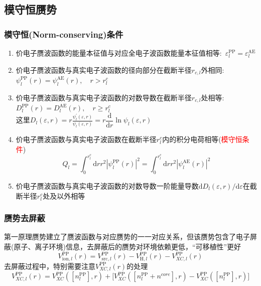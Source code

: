 \subsection{模守恒赝势}
\frame
{
	\frametitle{模守恒\textrm{(Norm-conserving)}条件}
	\begin{enumerate}
		\item 价电子赝波函数的能量本征值与对应全电子波函数能量本征值相等:~$\varepsilon_l^{\mathrm{PP}}=\varepsilon_l^{\mathrm{AE}}$
		\item 价电子赝波函数与真实电子波函数的径向部分在截断半径$r_{c,l}$外相同:~$\psi_l^{\mathrm{PP}}(r)=\psi_l^{\mathrm{AE}}(r),\quad r>r_{l}^c$
		\item 价电子赝波函数与真实电子波函数的对数导数在截断半径$r_{c,l}$处相等:~$D_l^{\mathrm{PP}}(r)=D_l^{\mathrm{AE}}(r),\quad r\geqslant r_{l}^c$\\
		这里$D_l(\varepsilon,r)=r\frac{\psi_l^{\prime}(\varepsilon,r)}{\psi_l(\varepsilon,r)}=r\dfrac{\mathrm{d}}{\mathrm{d}r}\ln\psi_l(\varepsilon,r)$
		\item 价电子赝波函数与真实电子波函数在截断半径$r_{l}^c$内的积分电荷相等(\textcolor{red}{模守恒条件})
			$$Q_l=\int_0^{r_{l}^c}\mathrm{d}rr^2|\psi_l^{\mathrm{PP}}(r)|^2=\int_0^{r_{l}^c}\mathrm{d}rr^2|\psi_l^{\mathrm{AE}}(r)|^2$$
		\item 价电子赝波函数与真实电子波函数的对数导数一阶能量导数$\mathrm{d}D_l(\varepsilon,r)/\mathrm{d}\varepsilon$在截断半径$r_{l}^c$处及以外相等
	\end{enumerate}
}

%
\frame
{
	\frametitle{赝势去屏蔽}
	第一原理赝势建立了赝波函数与对应赝势的一一对应关系，但该赝势包含了电子屏蔽(原子、离子环境)信息，去屏蔽后的赝势对环境依赖更低，“可移植性”更好
	$$V_{\mathrm{ion},l}^{\mathrm{PP}}(r)=V_{\mathrm{src},l}^{\mathrm{PP}}(r)-V_{\mathrm{H},l}^{\mathrm{PP}}(r)-V_{XC,l}^{\mathrm{PP}}(r)$$
	去屏蔽过程中，特别需要注意$V_{XC,l}^{\mathrm{PP}}(r)$的处理
	$$V_{XC,l}^{\mathrm{PP}}(r)=V_{XC}^{\mathrm{PP}}([n_l^{\mathrm{PP}}],r)+\big[V_{XC}^{\mathrm{PP}}([n_l^{\mathrm{PP}}+n^{core}],r)-V_{XC}^{\mathrm{PP}}([n_l^{\mathrm{PP}}],r)\big]$$
}

